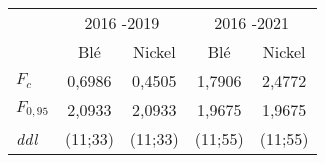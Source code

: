 \begin{tabular}{lcccc}
\toprule
    & \multicolumn{2}{c}{2016 -2019}   & \multicolumn{2}{c}{2016 -2021} \\
    & Blé  & Nickel & Blé  & Nickel \\
  \cmidrule(r){1-1}\cmidrule(lr){2-3}\cmidrule(l){4-5}
  $F_{c}$ & 0,6986  & 0,4505  &  1,7906 & 2,4772                     \\ 
  $F_{0,95}$ & 2,0933 & 2,0933	& 1,9675 & 1,9675\\
  \textit{ddl} &  (11;33)& (11;33) & (11;55) & (11;55)\\
  \bottomrule             
\end{tabular}